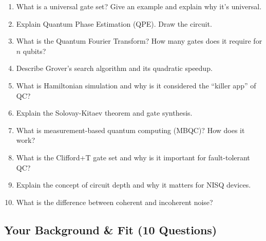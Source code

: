 \documentclass[11pt,a4paper]{article}
\begin{document}
\begin{questionbox}
\begin{enumerate}[label=\textbf{Q\arabic*.}, start=76]
    \item What is a universal gate set? Give an example and explain why it's universal.
    \item Explain Quantum Phase Estimation (QPE). Draw the circuit.
    \item What is the Quantum Fourier Transform? How many gates does it require for $n$ qubits?
    \item Describe Grover's search algorithm and its quadratic speedup.
    \item What is Hamiltonian simulation and why is it considered the ``killer app'' of QC?
    \item Explain the Solovay-Kitaev theorem and gate synthesis.
    \item What is measurement-based quantum computing (MBQC)? How does it work?
    \item What is the Clifford+T gate set and why is it important for fault-tolerant QC?
    \item Explain the concept of circuit depth and why it matters for NISQ devices.
    \item What is the difference between coherent and incoherent noise?
\end{enumerate}
\end{questionbox}

\subsection{Your Background \& Fit (10 Questions)}
\end{document}
